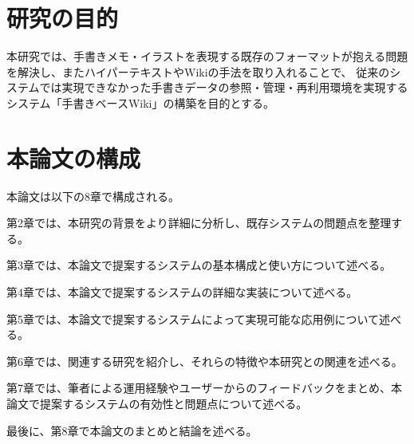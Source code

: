 \section{研究の目的}
本研究では、手書きメモ・イラストを表現する既存のフォーマットが抱える問題を解決し、またハイパーテキストやWikiの手法を取り入れることで、
従来のシステムでは実現できなかった手書きデータの参照・管理・再利用環境を実現するシステム「手書きベースWiki」の構築を目的とする。

\newpage

\section{本論文の構成}

本論文は以下の8章で構成される。

第2章では、本研究の背景をより詳細に分析し、既存システムの問題点を整理する。

第3章では、本論文で提案するシステムの基本構成と使い方について述べる。

第4章では、本論文で提案するシステムの詳細な実装について述べる。

第5章では、本論文で提案するシステムによって実現可能な応用例について述べる。

第6章では、関連する研究を紹介し、それらの特徴や本研究との関連を述べる。

第7章では、筆者による運用経験やユーザーからのフィードバックをまとめ、本論文で提案するシステムの有効性と問題点について述べる。

最後に、第8章で本論文のまとめと結論を述べる。